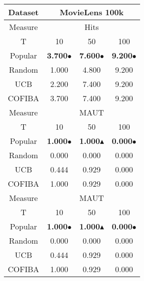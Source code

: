 \documentclass{standalone}
\begin{document}
    \begin{tabular}{|c|ccc|}
    \hline
    \rowcolor{StrongGray}
    Dataset & \multicolumn{3}{c|}{MovieLens 100k} \\
\hline
\hline
\rowcolor{Gray}
Measure & \multicolumn{3}{c|}{Hits} \\
\hline
\rowcolor{Gray}
T & 10 & 50 & 100 \\
\hline
\hline
Popular & \textbf{3.700\textcolor[rgb]{0.7,0.7,0.0}{$\bullet$}} & \textbf{7.600\textcolor[rgb]{0.7,0.7,0.0}{$\bullet$}} & \textbf{9.200\textcolor[rgb]{0.7,0.7,0.0}{$\bullet$}}\\\hline
Random & 1.000 & 4.800 & 9.200\\\hline
UCB & 2.200 & 7.400 & 9.200\\\hline
COFIBA & 3.700 & 7.400 & 9.200\\\hline

\hline
\hline
\rowcolor{Gray}
Measure & \multicolumn{3}{c|}{MAUT} \\
\hline
\rowcolor{Gray}
T & 10 & 50 & 100 \\
\hline
\hline
Popular & \textbf{1.000\textcolor[rgb]{0.7,0.7,0.0}{$\bullet$}} & \textbf{1.000\textcolor[rgb]{00,0.45,0.10}{$\blacktriangle$}} & \textbf{0.000\textcolor[rgb]{0.7,0.7,0.0}{$\bullet$}}\\\hline
Random & 0.000 & 0.000 & 0.000\\\hline
UCB & 0.444 & 0.929 & 0.000\\\hline
COFIBA & 1.000 & 0.929 & 0.000\\\hline

\hline
\hline
\rowcolor{Gray}
Measure & \multicolumn{3}{c|}{MAUT} \\
\hline
\rowcolor{Gray}
T & 10 & 50 & 100 \\
\hline
\hline
Popular & \textbf{1.000\textcolor[rgb]{0.7,0.7,0.0}{$\bullet$}} & \textbf{1.000\textcolor[rgb]{00,0.45,0.10}{$\blacktriangle$}} & \textbf{0.000\textcolor[rgb]{0.7,0.7,0.0}{$\bullet$}}\\\hline
Random & 0.000 & 0.000 & 0.000\\\hline
UCB & 0.444 & 0.929 & 0.000\\\hline
COFIBA & 1.000 & 0.929 & 0.000\\\hline

    \end{tabular}
    
\end{document}
